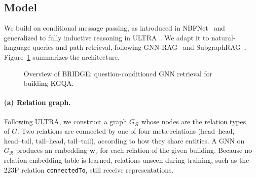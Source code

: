 \documentclass[11pt]{article}
\newcommand{\code}[1]{\texttt{#1}}
\begin{document}
\subsection{Model}

We build on conditional message passing, as introduced in NBFNet~\cite{zhu2021nbfnet} and generalized to fully inductive reasoning in ULTRA~\cite{galkin2024ultra}. We adapt it to natural-language queries and path retrieval, following GNN-RAG~\cite{mavromatis2025gnnrag} and SubgraphRAG~\cite{li2025subgraphrag}. Figure~\ref{fig:model} summarizes the architecture.

\begin{figure}[h]
\centering
{}
\caption{Overview of BRIDGE: question-conditioned GNN retrieval for building KGQA.}
\label{fig:model}
\end{figure}

\paragraph{(a) Relation graph.}
Following ULTRA, we construct a graph $G_{\mathcal{R}}$ whose nodes are the relation types of $G$. Two relations are connected by one of four meta-relations (head--head, head--tail, tail--head, tail--tail), according to how they share entities. A GNN on $G_{\mathcal{R}}$ produces an embedding $\mathbf{w}_r$ for each relation of the given building. Because no relation embedding table is learned, relations unseen during training, such as the 223P relation \code{connectedTo}, still receive representations.
\end{document}
